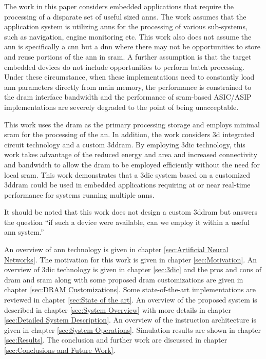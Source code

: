 The work in this paper considers embedded applications that require the processing of a disparate set of useful sized \ac{ann}s. The work assumes that the application system is utilizing \ac{ann}s
for the processing of various sub-systems, such as navigation, engine monitoring etc. This work also does not assume the \ac{ann} is specifically a \ac{cnn} but a \ac{dnn} where there may
not be opportunities to store and reuse portions of the \ac{ann} in \ac{sram}. A further assumption is that the target embedded devices do not include opportunities to perform batch processing.
Under these circumstance, when these implementations need to constantly load \ac{ann} parameters directly from main memory, the performance is constrained to the \ac{dram} interface bandwidth and the performance of \ac{sram}-based ASIC/ASIP implementations are severely degraded to the point of being unacceptable.

This work uses the \ac{dram} as the primary processing storage and employs minimal \ac{sram} for the processing of the \ac{an}.
In addition, the work considers \ac{3d} integrated circuit technology and a custom \ac{3ddram}. By employing \ac{3dic} technology, this work takes advantage of the reduced energy and area and increased
connectivity and bandwidth to allow the \ac{dram} to be employed efficiently without the need for local \ac{sram}.
This work demonstrates that a \ac{3dic} system based on a customized \ac{3ddram} could be used in embedded applications requiring at or near real-time performance for systems running multiple \ac{ann}s.

It should be noted that this work does not design a custom \ac{3ddram} but answers the question ``if such a device were available, can we employ it within a useful \ac{ann} system.''

\hfill %

An overview of \ac{ann} technology is given in chapter \ref{sec:Artificial Neural Networks}.
The motivation for this work is given in chapter \ref{sec:Motivation}.
An overview of \ac{3dic} technology is given in chapter \ref{sec:3dic} and the pros and cons of \ac{dram} and \ac{sram} along with some proposed \ac{dram} customizations are given in chapter \ref{sec:DRAM Customizations}.
Some state-of-the-art implementations are reviewed in chapter \ref{sec:State of the art}.
An overview of the proposed system is described in chapter \ref{sec:System Overview} with more details in chapter \ref{sec:Detailed System Description}.
An overview of the instruction architecture is given in chapter \ref{sec:System Operations}.
Simulation results are shown in chapter \ref{sec:Results}.
The conclusion and further work are discussed in chapter \ref{sec:Conclusions and Future Work}.


